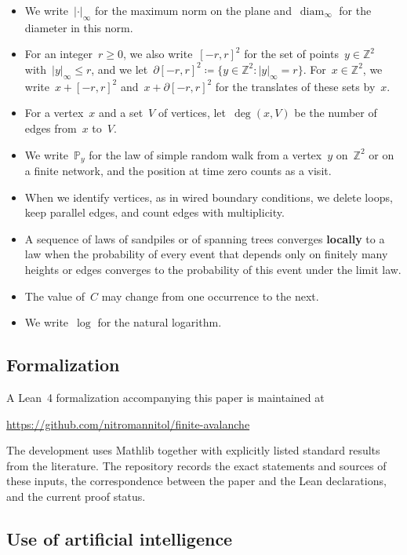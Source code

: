 \documentclass[11pt]{amsart}
\numberwithin{equation}{section}
\newcommand{\Z}{\mathbb Z}
\newcommand{\PP}{\mathbb P}
\DeclareMathOperator{\diam}{diam}
\begin{document}
\begin{itemize}
\item We write~$|\cdot|_\infty$ for the maximum norm on the plane and~$\diam_\infty$ for the diameter in this norm.
\item For an integer~$r\geq0$, we also write~$[-r,r]^2$ for the set of points~$y\in\Z^2$ with~$|y|_\infty\leq r$, and we let~$\partial[-r,r]^2\coloneqq\{y\in\Z^2:|y|_\infty=r\}$. For~$x\in\Z^2$, we write~$x+[-r,r]^2$ and~$x+\partial[-r,r]^2$ for the translates of these sets by~$x$.
\item For a vertex~$x$ and a set~$V$ of vertices, let~$\deg(x,V)$ be the number of edges from~$x$ to~$V$.
\item We write~$\PP_y$ for the law of simple random walk from a vertex~$y$ on~$\Z^2$ or on a finite network, and the position at time zero counts as a visit.
\item When we identify vertices, as in wired boundary conditions, we delete loops, keep parallel edges, and count edges with multiplicity.
\item A sequence of laws of sandpiles or of spanning trees converges \textbf{locally} to a law when the probability of every event that depends only on finitely many heights or edges converges to the probability of this event under the limit law.
\item The value of~$C$ may change from one occurrence to the next.
\item We write~$\log$ for the natural logarithm.
\end{itemize}

\subsection{Formalization}\label{ssec:formalization}

A Lean~4 formalization accompanying this paper is maintained at
\begin{center}
\url{https://github.com/nitromannitol/finite-avalanche}
\end{center}
The development uses Mathlib together with explicitly listed standard results from the literature. The repository records the exact statements and sources of these inputs, the correspondence between the paper and the Lean declarations, and the current proof status.

\subsection*{Use of artificial intelligence}
\end{document}
